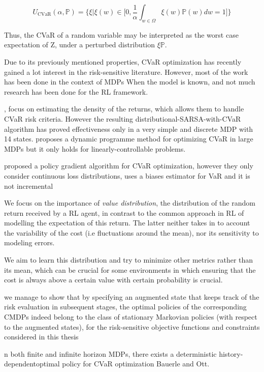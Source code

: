 \begin{equation}
    U_{\text{CVaR}}(\alpha, \mathbb{P}) = \Big\{\xi | \xi(w)  \in \big [ 0, \frac{1}{\alpha} \int_{w\in\Omega} \xi(w)\mathbb{P}(w)dw=1   \big ] \Big\}
\end{equation}

Thus, the CVaR of a random variable may be interpreted as the worst case expectation of Z, under
a perturbed distribution $\xi \mathbb{P}$.

Due to its previously mentioned properties, CVaR optimization has recently gained a lot interest in the
risk-sensitive literature. However, most of the work has been done in the context of MDPs When
the model is known, and not much research has been done for the RL framework.

\citet{Morimura2010}\citet{Morimura2010b}, focus on estimating the density of the returns,
which allows them to handle CVaR risk criteria. However the resulting distributional-SARSA-with-CVaR algorithm
has  proved  effectiveness  only  in  a  very  simple  and discrete MDP with 14 states.
\citet{Petrik2012} proposes a dynamic programme 
method for optimizing CVaR in large MDPs but it only holds for linearly-controllable problems.

\citet{Tamar2015a} proposed a policy gradient algorithm for CVaR optimization, however they only consider continuous loss
distributions, uses a biases estimator for VaR and it is not incremental 

We focus on the importance of \textit{value distribution}, the distribution of the random return received by a RL
agent, in contrast to the common approach in RL of modelling the expectation of this return.
The latter neither takes in to account the variability of the cost (i.e fluctuations around the mean), nor its sensitivity to modeling errors. \cite{Chow2015}

We aim to learn this distribution and try to minimize other metrics rather than its mean, which can be crucial for some environments 
in which ensuring that the cost is always above a certain value with certain probability is crucial.






we manage to show that by specifying an augmented state that keeps track of the risk evaluation in
subsequent stages, the optimal policies of the corresponding CMDPs indeed belong to the class of stationary
Markovian policies (with respect to the augmented states), for the risk-sensitive objective functions and
constraints considered in this thesis

n both finite and infinite horizon MDPs, there exists a deterministic history-dependentoptimal
policy for CVaR optimization Bauerle and Ott.